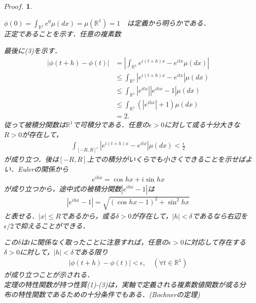 \documentclass[a4j,papersize,disablejfam,slide,14pt]{jsarticle}
\newtheorem{Proof}{$Proof.$}
\def\sin#1#2{\operatorname{sin}^{#2} #1} %
\def\cos#1#2{\operatorname{cos}^{#2} #1} %
\def\exp#1{e^{#1}} %
\begin{document}
    \begin{Proof}
    	\begin{description}
        	$\phi(0) = \int_{\mathbb{R}^1} \exp{0} \mu(dx) = \mu(\mathbb{R}^1) = 1\quad$は定義から明らかである．\\
            正定であることを示す．任意の複素数
            
            最後に(3)を示す．
            \begin{align}
            	\left| \phi(t+h) - \phi(t) \right| &= \left| \int_{\mathbb{R}^1} \exp{i(t+h)x} - \exp{itx} \mu(dx) \right| \\
                &\leq \int_{\mathbb{R}^1} \left| \exp{i(t+h)x} - \exp{itx} \right| \mu(dx) \\
                &\leq \int_{\mathbb{R}^1} \left| \exp{itx} \right| \left| \exp{ihx} - 1 \right| \mu(dx) \\
                &\leq \int_{\mathbb{R}^1} (\left| \exp{ihx} \right| + 1)  \mu(dx) \\
                &= 2.
            \end{align}
            従って被積分関数は$\mathbb{R}^1$で可積分である．任意の$\epsilon > 0$に対して或る十分大きな$R > 0$が存在して，
            \begin{align}
            	\int_{[-R, R]^c} \left| \exp{i(t+h)x} - \exp{itx} \right| \mu(dx) < \frac{\epsilon}{2}
            \end{align}
            が成り立つ．後は$[-R, R]$上での積分がいくらでも小さくできることを示せばよい．{\rm Euler}の関係から
            \begin{align}
            	\exp{ihx} = \cos{hx}{} + i\sin{hx}{}
            \end{align}
            が成り立つから，途中式の被積分関数$\left| \exp{ihx} - 1 \right|$は
            \begin{align}
            	\left| \exp{ihx} - 1 \right| = \sqrt{(\cos{hx}{} - 1)^2 + \sin{hx}{2}}
            \end{align}
            と表せる．$|x| \leq R$であるから，或る$\delta > 0$が存在して，$|h| < \delta$であるなら右辺を$\epsilon/2$で抑えることができる．
            
            
            この$\delta$は$t$に関係なく取ったことに注意すれば，任意の$\epsilon > 0$に対応して存在する$\delta > 0$に対して，$|h| < \delta$である限り
            \begin{align}
            	\left| \phi(t+h) - \phi(t) \right| < \epsilon, \quad (\forall t \in \mathbb{R}^1)
            \end{align}
            が成り立つことが示される．\\
            定理の特性関数が持つ性質(1)-(3)は，実軸で定義される複素数値関数が或る分布の特性関数であるための十分条件でもある．({\rm Bochner}の定理)
        \end{description}
    \end{Proof}
    
\end{document}
